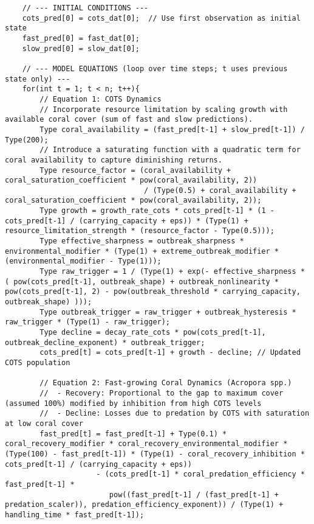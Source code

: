 \begin{lstlisting}
    // --- INITIAL CONDITIONS ---
    cots_pred[0] = cots_dat[0];  // Use first observation as initial state
    fast_pred[0] = fast_dat[0];
    slow_pred[0] = slow_dat[0];
    
    // --- MODEL EQUATIONS (loop over time steps; t uses previous state only) ---
    for(int t = 1; t < n; t++){
        // Equation 1: COTS Dynamics
        // Incorporate resource limitation by scaling growth with available coral cover (sum of fast and slow predictions).
        Type coral_availability = (fast_pred[t-1] + slow_pred[t-1]) / Type(200);
        // Introduce a saturating function with a quadratic term for coral availability to capture diminishing returns.
        Type resource_factor = (coral_availability + coral_saturation_coefficient * pow(coral_availability, 2))
                                / (Type(0.5) + coral_availability + coral_saturation_coefficient * pow(coral_availability, 2));
        Type growth = growth_rate_cots * cots_pred[t-1] * (1 - cots_pred[t-1] / (carrying_capacity + eps)) * (Type(1) + resource_limitation_strength * (resource_factor - Type(0.5)));
        Type effective_sharpness = outbreak_sharpness * environmental_modifier * (Type(1) + extreme_outbreak_modifier * (environmental_modifier - Type(1)));
        Type raw_trigger = 1 / (Type(1) + exp(- effective_sharpness * ( pow(cots_pred[t-1], outbreak_shape) + outbreak_nonlinearity * pow(cots_pred[t-1], 2) - pow(outbreak_threshold * carrying_capacity, outbreak_shape) )));
        Type outbreak_trigger = raw_trigger + outbreak_hysteresis * raw_trigger * (Type(1) - raw_trigger);
        Type decline = decay_rate_cots * pow(cots_pred[t-1], outbreak_decline_exponent) * outbreak_trigger;
        cots_pred[t] = cots_pred[t-1] + growth - decline; // Updated COTS population
        
        // Equation 2: Fast-growing Coral Dynamics (Acropora spp.)
        //  - Recovery: Proportional to the gap to maximum cover (assumed 100%) modified by inhibition from high COTS levels
        //  - Decline: Losses due to predation by COTS with saturation at low coral cover
        fast_pred[t] = fast_pred[t-1] + Type(0.1) * coral_recovery_modifier * coral_recovery_environmental_modifier * (Type(100) - fast_pred[t-1]) * (Type(1) - coral_recovery_inhibition * cots_pred[t-1] / (carrying_capacity + eps))
                     - (cots_pred[t-1] * coral_predation_efficiency * fast_pred[t-1] *
                        pow((fast_pred[t-1] / (fast_pred[t-1] + predation_scaler)), predation_efficiency_exponent)) / (Type(1) + handling_time * fast_pred[t-1]);
        

\end{lstlisting}
